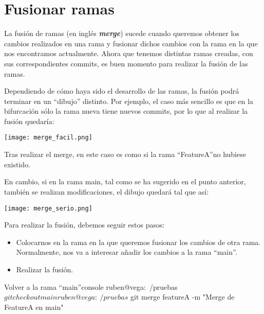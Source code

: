 \chapter{Fusionar ramas}

La fusión de ramas (en inglés \textit{\textbf{merge}}) sucede cuando queremos obtener los cambios realizados en una rama y fusionar dichos cambios con la rama en la que nos encontramos actualmente.  Ahora que tenemos distintas ramas creadas, con sus correspondientes commits, es buen momento para realizar la fusión de las ramas.


Dependiendo de cómo haya sido el desarrollo de las ramas, la fusión podrá terminar en un “dibujo” distinto. Por ejemplo, el caso más sencillo es que en la bifurcación sólo la rama nueva tiene nuevos commits, por lo que al realizar la fusión quedaría:


\begin{center}
    \texttt{[image: merge\_facil.png]}
\end{center}

Tras realizar el merge, en este caso es como si la rama “FeatureA”no hubiese existido.

En cambio, si en la rama main, tal como se ha sugerido en el punto anterior, también se realizan modificaciones, el dibujo quedará tal que así:

\begin{center}
    \texttt{[image: merge\_serio.png]}
\end{center}


Para realizar la fusión, debemos seguir estos pasos:
\begin{itemize}
    \item Colocarnos en la rama en la que queremos fusionar los cambios de otra rama. Normalmente, nos va a interesar añadir los cambios a la rama “main”.
    \item Realizar la fusión.
\end{itemize}


\begin{mycode}{Volver a la rama “main”}{console}{}
ruben@vega:~/pruebas$ git checkout main
ruben@vega:~/pruebas$ git merge featureA -m "Merge de FeatureA en main"
\end{mycode}


